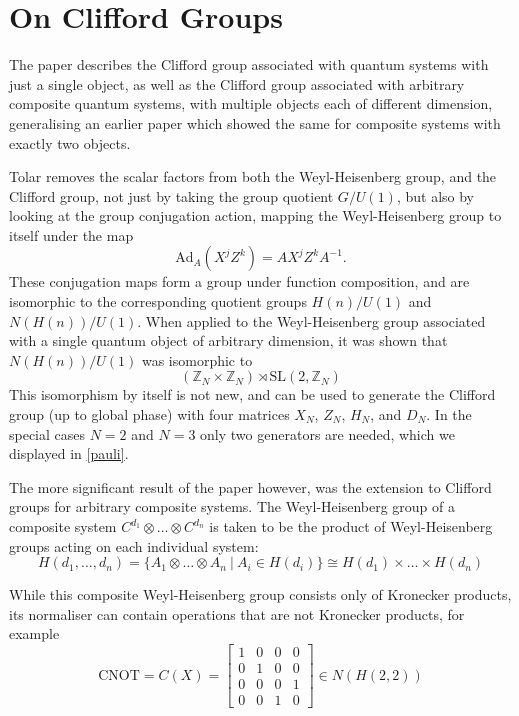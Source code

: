 \section{On Clifford Groups}\label{tolar-cliff}
The paper \cite{tolar-clifford} describes the Clifford group associated with quantum systems with just a single object, as well as the Clifford group associated with arbitrary composite quantum systems, with multiple objects each of different dimension, generalising an earlier paper \cite{tolar-symmetries} which showed the same for composite systems with exactly two objects.

Tolar removes the scalar factors from both the Weyl-Heisenberg group, and the Clifford group, not just by taking the group quotient $G/U(1)$, but also by looking at the group conjugation action, mapping the Weyl-Heisenberg group to itself under the map
\[\text{Ad}_A(X^jZ^k) = AX^jZ^kA^{-1}.\]
These conjugation maps form a group under function composition, and are isomorphic to the corresponding quotient groups $H(n)/U(1)$ and $N(H(n))/U(1)$. When applied to the Weyl-Heisenberg group associated with a single quantum object of arbitrary dimension, it was shown that $N(H(n))/U(1)$ was isomorphic to
\[(\mathbb{Z}_N\times\mathbb{Z}_N)\rtimes\text{SL}(2,\mathbb{Z}_N)\]
This isomorphism by itself is not new, and can be used to generate the Clifford group (up to global phase) with four matrices $X_N$, $Z_N$,  $H_N$, and $D_N$. In the special cases $N=2$ and $N=3$ only two generators are needed, which we displayed in \autoref{pauli}. 

The more significant result of the paper however, was the extension to Clifford groups for arbitrary composite systems. The Weyl-Heisenberg group of a composite system $C^{d_1}\otimes \dots \otimes C^{d_n}$ is taken to be the product of Weyl-Heisenberg groups acting on each individual system:
\[H(d_1, \dots, d_n) = \{A_1 \otimes \dots \otimes A_n\ |\ A_i \in H(d_i)\} \cong H(d_1) \times \dots \times H(d_n)\]

While this composite Weyl-Heisenberg group consists only of Kronecker products, its normaliser can contain operations that are not Kronecker products, for example
\[\text{CNOT} = C(X) = \left[\begin{matrix}
	1 & 0 & 0 & 0 \\
	0 & 1 & 0 & 0 \\
	0 & 0 & 0 & 1 \\
	0 & 0 & 1 & 0
\end{matrix}\right] \in N(H(2, 2))\]

